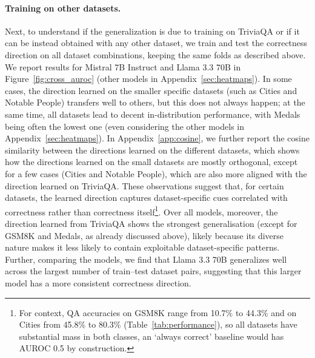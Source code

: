 \documentclass{article} %
\begin{document}
\paragraph{Training on other datasets.} Next, to understand if the generalization is due to training on TriviaQA or if it can be instead obtained with any other dataset, we train and test the correctness direction on all dataset combinations, keeping the same folds as described above. %
We report results for Mistral 7B Instruct and Llama 3.3 70B in Figure~\ref{fig:cross_auroc} (other models in Appendix~\ref{sec:heatmaps}). In some cases, the direction learned on the smaller specific datasets (such as Cities and Notable People) transfers well to others, but this does not always happen; at the same time, all datasets lead to decent in-distribution performance, with Medals being often the lowest one (even considering the other models in Appendix~\ref{sec:heatmaps}). 
In Appendix~\ref{app:cosine}, we further report the cosine similarity between the directions learned on the different datasets, which shows how the directions learned on the small datasets are mostly orthogonal, except for a few cases (Cities and Notable People), which are also more aligned with the direction learned on TriviaQA.
These observations suggest that, for certain datasets, the learned direction captures dataset-specific cues correlated with correctness rather than correctness itself\footnote{For context, QA accuracies on GSM8K range from 10.7\% to 44.3\% and on Cities from 45.8\% to 80.3\% (Table~\ref{tab:performance}), so all datasets have substantial mass in both classes, an ‘always correct’ baseline would has AUROC 0.5 by construction.}. Over all models, moreover, the direction learned from TriviaQA shows the strongest generalisation (except for GSM8K and Medals, as already discussed above), likely because its diverse nature makes it less likely to contain exploitable dataset-specific patterns. Further, comparing the models, we find that Llama 3.3 70B generalizes well across the largest number of train–test dataset pairs, suggesting that this larger model has a more consistent correctness direction. 
\end{document}
